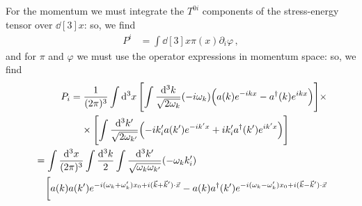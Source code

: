 \documentclass[main.tex]{subfiles}
\begin{document}
For the momentum we must integrate the \(T^{0i}\) components of the stress-energy tensor over \(\dd[3]{x}\): so, we find
%
\begin{align}
P^{i} &= \int \dd[3]{x} \pi (x) \partial_{i} \varphi  
\,,
\end{align}
%
and for \(\pi \) and \(\varphi \) we must use the operator expressions in momentum space: so, we find 
%
\begin{subequations}
\begin{align}
\begin{split}
P_{i}&= \frac{1}{(2 \pi)^3} \int \dd[3]{x} 
\qty[
\int \frac{ \dd[3]{k}}{\sqrt{2 \omega_{k}}} 
(-i \omega_{k}) \qty(a(k) e^{-ikx} - a ^\dag (k) e^{ikx})
] \times  \\
&\phantom{=}\ 
\times \qty[
\int \frac{ \dd[3]{k'}}{\sqrt{2 \omega_{k'}}} 
\qty(-i k_i^{\prime } a(k') e^{-ik'x} +i k_i' a ^\dag (k') e^{ik'x})]
\end{split} \\
\begin{split}
&= \int \frac{ \dd[3]{x}}{(2 \pi )^3} \int \frac{ \dd[3]{k}}{2} 
\int \frac{ \dd[3]{k'}}{\sqrt{\omega_{k} \omega_{k'}}} 
(- \omega_{k} k_i')  \\
&\phantom{=}\ 
\bigg[
a(k) a(k') e^{-i (\omega_{k} + \omega_{k}') x_0 + i (\vec{k} + \vec{k}')\cdot \vec{x}} 
-a(k) a ^\dag(k') e^{-i(\omega_{k} - \omega_{k}') x_0 + i (\vec{k} - \vec{k}')\cdot \vec{x}} \\

\end{split}
\end{align}
\end{subequations}
\end{document}
